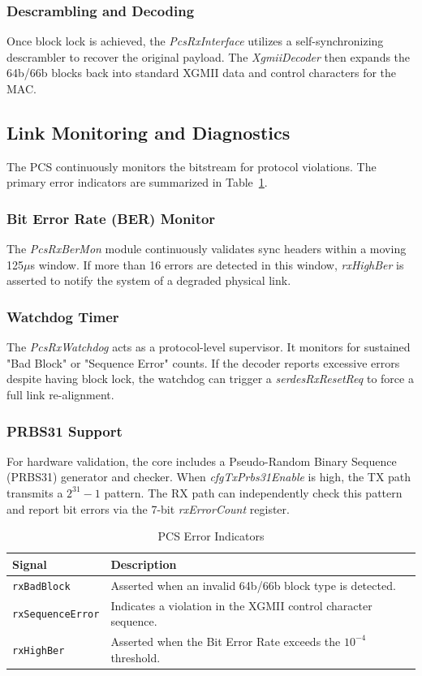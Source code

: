 \subsubsection{Descrambling and Decoding}
Once block lock is achieved, the \textit{PcsRxInterface} utilizes a self-synchronizing descrambler to recover the original payload. The \textit{XgmiiDecoder} then expands the 64b/66b blocks back into standard XGMII data and control characters for the MAC.

\subsection{Link Monitoring and Diagnostics}
The PCS continuously monitors the bitstream for protocol violations. The primary error indicators are summarized in Table~\ref{table:pcs_errors}.

\subsubsection{Bit Error Rate (BER) Monitor}
The \textit{PcsRxBerMon} module continuously validates sync headers within a moving 125$\mu$s window. If more than 16 errors are detected in this window, \textit{rxHighBer} is asserted to notify the system of a degraded physical link.

\subsubsection{Watchdog Timer}
The \textit{PcsRxWatchdog} acts as a protocol-level supervisor. It monitors for sustained "Bad Block" or "Sequence Error" counts. If the decoder reports excessive errors despite having block lock, the watchdog can trigger a \textit{serdesRxResetReq} to force a full link re-alignment.

\subsubsection{PRBS31 Support}
For hardware validation, the core includes a Pseudo-Random Binary Sequence (PRBS31) generator and checker. When \textit{cfgTxPrbs31Enable} is high, the TX path transmits a $2^{31}-1$ pattern. The RX path can independently check this pattern and report bit errors via the 7-bit \textit{rxErrorCount} register.

\begin{table}[H]
\centering
\begin{tabular}{|l|l|}
\hline
\textbf{Signal} & \textbf{Description} \\ \hline \hline
\texttt{rxBadBlock} & Asserted when an invalid 64b/66b block type is detected. \\ \hline
\texttt{rxSequenceError} & Indicates a violation in the XGMII control character sequence. \\ \hline
\texttt{rxHighBer} & Asserted when the Bit Error Rate exceeds the $10^{-4}$ threshold. \\ \hline
\end{tabular}
\caption{PCS Error Indicators}\label{table:pcs_errors}
\end{table}

